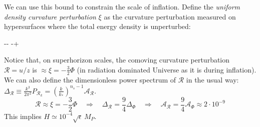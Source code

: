 We can use this bound to constrain the scale of inflation. Define the \textit{uniform density curvature perturbation} $\mathcal{\xi}$ as the curvature perturbation measured on hypersurfaces where the total energy density is unperturbed:
\begin{eqopt}[darkgreen]
    \equiv -\Phi - \delta \phi \qquad \mathcal{\xi} \equiv -\Phi +  
\end{eqopt}
Notice that, on superhorizon scales, the comoving curvature perturbation $\mathcal{R}=u/z$ is $\approx\mathcal{\xi}= -\frac{3}{2}\Phi$ (in radiation dominated Universe as it is during inflation).  
We can also define the dimensionless power spectrum of $\mathcal{R}$ in the usual way: $\Delta_{\mathcal{R}} \equiv \frac{k^3}{2\pi^2} P_{\mathcal{R}_k} =\left(\frac{k}{k_*}\right)^{n_s-1} \mathcal{A}_{\mathcal{R}}$.
\begin{equation}
    \mathcal{R} \approx \mathcal{\xi}= -\frac{3}{2}\Phi \quad \Rightarrow \quad \Delta_{\mathcal{R}} = \frac{9}{4} \Delta_{\Phi} \quad \Rightarrow \quad \mathcal{A}_{\mathcal{R}} = \frac{9}{4}  \mathcal{A}_\Phi \approx 2\cdot 10^{-9}
\end{equation}
This implies $H\simeq 10^{-4} \sqrt{\epsilon} \,M_P$.